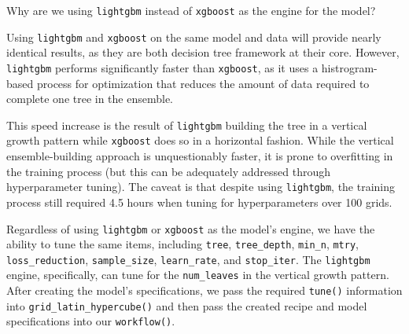 \documentclass[
  letterpaper,
]{krantz}
\begin{document}
\begin{tcolorbox}[enhanced jigsaw, colback=white, leftrule=.75mm, breakable, colframe=quarto-callout-note-color-frame, bottomtitle=1mm, rightrule=.15mm, left=2mm, opacityback=0, bottomrule=.15mm, arc=.35mm, coltitle=black, colbacktitle=quarto-callout-note-color!10!white, toptitle=1mm, titlerule=0mm, title=\textcolor{quarto-callout-note-color}{\faInfo}\hspace{0.5em}{Note}, toprule=.15mm, opacitybacktitle=0.6]

Why are we using \texttt{lightgbm} instead of \texttt{xgboost} as the
engine for the model?

Using \texttt{lightgbm} and \texttt{xgboost} on the same model and data
will provide nearly identical results, as they are both decision tree
framework at their core. However, \texttt{lightgbm} performs
significantly faster than \texttt{xgboost}, as it uses a
histrogram-based process for optimization that reduces the amount of
data required to complete one tree in the ensemble.

This speed increase is the result of \texttt{lightgbm} building the tree
in a vertical growth pattern while \texttt{xgboost} does so in a
horizontal fashion. While the vertical ensemble-building approach is
unquestionably faster, it is prone to overfitting in the training
process (but this can be adequately addressed through hyperparameter
tuning). The caveat is that despite using \texttt{lightgbm}, the
training process still required 4.5 hours when tuning for
hyperparameters over 100 grids.

\end{tcolorbox}

Regardless of using \texttt{lightgbm} or \texttt{xgboost} as the model's
engine, we have the ability to tune the same items, including
\texttt{tree}, \texttt{tree\_depth}, \texttt{min\_n}, \texttt{mtry},
\texttt{loss\_reduction}, \texttt{sample\_size}, \texttt{learn\_rate},
and \texttt{stop\_iter}. The \texttt{lightgbm} engine, specifically, can
tune for the \texttt{num\_leaves} in the vertical growth pattern. After
creating the model's specifications, we pass the required
\texttt{tune()} information into \texttt{grid\_latin\_hypercube()} and
then pass the created recipe and model specifications into our
\texttt{workflow()}.
\end{document}
